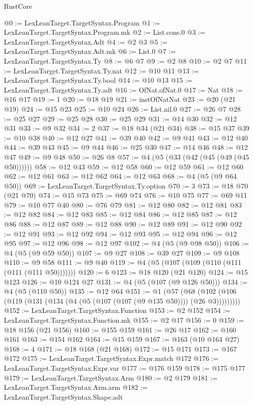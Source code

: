 \begin{lexlean}{RustCore}
\begin{coremodule}
@0 := LexLeanTarget.TargetSyntax.Program
@1 := LexLeanTarget.TargetSyntax.Program.mk
@2 := List.cons.{0}
@3 := LexLeanTarget.TargetSyntax.Adt
@4 := @2 @3
@5 := LexLeanTarget.TargetSyntax.Adt.mk
@6 := List.{0}
@7 := LexLeanTarget.TargetSyntax.Ty
@8 := @6 @7
@9 := @2 @8
@10 := @2 @7
@11 := LexLeanTarget.TargetSyntax.Ty.nat
@12 := @10 @11
@13 := LexLeanTarget.TargetSyntax.Ty.bool
@14 := @10 @13
@15 := LexLeanTarget.TargetSyntax.Ty.adt
@16 := OfNat.ofNat.{0}
@17 := Nat
@18 := @16 @17
@19 := 1
@20 := @18 @19
@21 := instOfNatNat
@23 := @20 (@21 @19)
@24 := @15 @23
@25 := @10 @24
@26 := List.nil.{0}
@27 := @26 @7
@28 := @25 @27
@29 := @25 @28
@30 := @25 @29
@31 := @14 @30
@32 := @12 @31
@33 := @9 @32
@34 := 2
@37 := @18 @34 (@21 @34)
@38 := @15 @37
@39 := @10 @38
@40 := @12 @27
@41 := @39 @40
@42 := @9 @41
@43 := @12 @40
@44 := @39 @43
@45 := @9 @44
@46 := @25 @30
@47 := @14 @46
@48 := @12 @47
@49 := @9 @48
@50 := @26 @8
@57 := @4 (@5 (@33 (@42 (@45 (@49 (@45 @50))))))
@58 := @12 @43
@59 := @12 @58
@60 := @12 @59
@61 := @12 @60
@62 := @12 @61
@63 := @12 @62
@64 := @12 @63
@68 := @4 (@5 (@9 @64 @50))
@69 := LexLeanTarget.TargetSyntax.Ty.option
@70 := 3
@73 := @18 @70 (@21 @70)
@74 := @15 @73
@75 := @69 @74
@76 := @10 @75
@77 := @69 @11
@79 := @10 @77 @40
@80 := @76 @79
@81 := @12 @80
@82 := @12 @81
@83 := @12 @82
@84 := @12 @83
@85 := @12 @84
@86 := @12 @85
@87 := @12 @86
@88 := @12 @87
@89 := @12 @88
@90 := @12 @89
@91 := @12 @90
@92 := @12 @91
@93 := @12 @92
@94 := @12 @93
@95 := @12 @94
@96 := @12 @95
@97 := @12 @96
@98 := @12 @97
@102 := @4 (@5 (@9 @98 @50))
@106 := @4 (@5 (@9 @59 @50))
@107 := @9 @27
@108 := @39 @27
@109 := @9 @108
@110 := @9 @58
@111 := @9 @40
@119 := @4 (@5 (@107 (@109 (@110 (@111 (@111 (@111 @50)))))))
@120 := 6
@123 := @18 @120 (@21 @120)
@124 := @15 @123
@126 := @10 @124 @27
@131 := @4 (@5 (@107 (@9 @126 @50)))
@134 := @4 (@5 (@110 @50))
@135 := @12 @64
@151 := @1
    (@57 (@68 (@102 (@106 (@119 (@131 (@134 (@4 (@5 (@107 (@107 (@9 @135 @50)))) (@26 @3)))))))))
@152 := LexLeanTarget.TargetSyntax.Function
@153 := @2 @152
@154 := LexLeanTarget.TargetSyntax.Function.mk
@155 := @2 @17
@156 := 0
@159 := @18 @156 (@21 @156)
@160 := @155 @159
@161 := @26 @17
@162 := @160 @161
@163 := @154 @162
@164 := @15 @159
@167 := @163 (@10 @164 @27)
@168 := 4
@171 := @18 @168 (@21 @168)
@172 := @15 @171
@173 := @167 @172
@175 := LexLeanTarget.TargetSyntax.Expr.match @172
@176 := LexLeanTarget.TargetSyntax.Expr.var
@177 := @176 @159
@178 := @175 @177
@179 := LexLeanTarget.TargetSyntax.Arm
@180 := @2 @179
@181 := LexLeanTarget.TargetSyntax.Arm.arm
@182 := LexLeanTarget.TargetSyntax.Shape.adt

\end{coremodule}
\end{lexlean}
